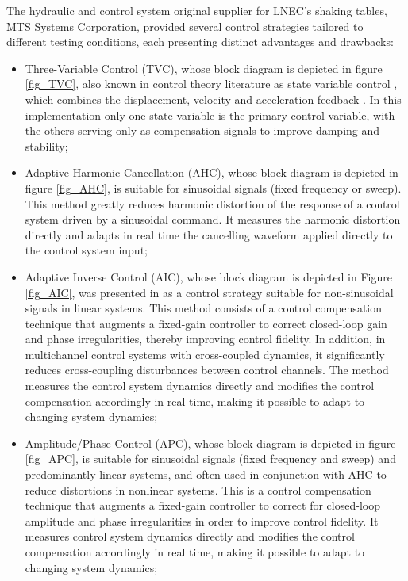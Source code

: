 \documentclass[  10pt, twoside]{report} %
\numberwithin{equation}{chapter}
\begin{document}
The hydraulic and control system original supplier for LNEC's shaking tables, MTS Systems Corporation, provided several control strategies tailored to different testing conditions, each presenting distinct advantages and drawbacks:

\begin{itemize}
    \item Three-Variable Control (TVC), whose block diagram is depicted in figure \ref{fig_TVC}, also known in control theory literature as state variable control \citep{ogata2010}, which combines the displacement, velocity and acceleration feedback \citep{williams2001}. In this implementation only one state variable is the primary control variable, with the others serving only as compensation signals to improve damping and stability;
    \item Adaptive Harmonic Cancellation (AHC), whose block diagram is depicted in figure \ref{fig_AHC}, is suitable for sinusoidal signals (fixed frequency or sweep). This method greatly reduces harmonic distortion of the response of a control system driven by a sinusoidal command. It measures the harmonic distortion directly and adapts in real time the cancelling waveform applied directly to the control system input; 
    \item Adaptive Inverse Control (AIC), whose block diagram is depicted in Figure \ref{fig_AIC}, was presented in \cite{widrow2007} as a control strategy suitable for non-sinusoidal signals in linear systems. This method consists of a control compensation technique that augments a fixed-gain controller to correct closed-loop gain and phase irregularities, thereby improving control fidelity. In addition, in multichannel control systems with cross-coupled dynamics, it significantly reduces cross-coupling disturbances between control channels. The method measures the control system dynamics directly and modifies the control compensation accordingly in real time, making it possible to adapt to changing system dynamics; 
\pagebreak
    \item Amplitude/Phase Control (APC), whose block diagram is depicted in figure \ref{fig_APC}, is suitable for sinusoidal signals (fixed frequency and sweep) and predominantly linear systems, and often used in conjunction with AHC to reduce distortions in nonlinear systems. This is a control compensation technique that augments a fixed-gain controller to correct for closed-loop amplitude and phase irregularities in order to improve control fidelity. It measures control system dynamics directly and modifies the control compensation accordingly in real time, making it possible to adapt to changing system dynamics; 

\end{itemize}
\end{document}
